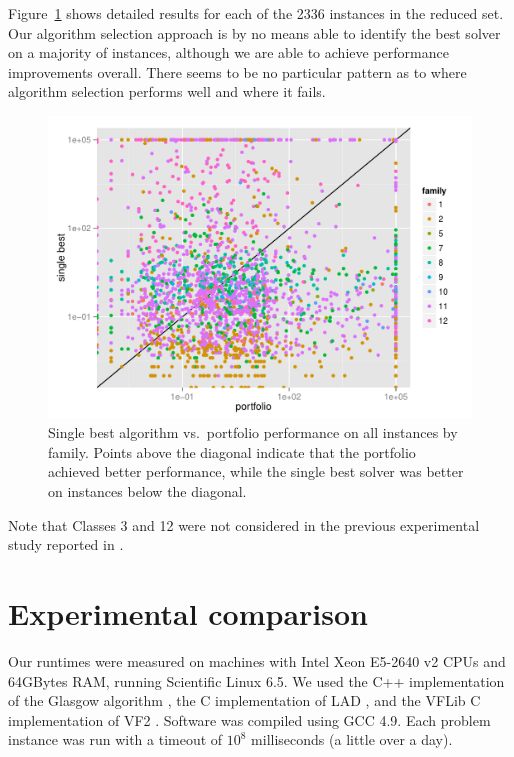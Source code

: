 \documentclass{llncs}
\begin{document}
Figure~\ref{fig:scatter} shows detailed results for each of the 2336 instances
in the reduced set. Our algorithm selection approach is by no means able to
identify the best solver on a majority of instances, although we are able to
achieve performance improvements overall. There seems to be no particular
pattern as to where algorithm selection performs well and where it fails.

\begin{figure}[!ht]
\includegraphics[width=\textwidth]{figures/perfScatter}
\caption{Single best algorithm vs.\ portfolio performance on all instances by
family. Points above the diagonal indicate that the portfolio achieved better
performance, while the single best solver was better on instances below the
diagonal.}
\label{fig:scatter}
\end{figure}

Note that Classes 3 and 12 were not considered in the previous experimental study reported in \cite{McCreesh:2015}.

\section{Experimental comparison}

Our runtimes were measured on machines with Intel Xeon E5-2640 v2 CPUs and 64GBytes RAM, running
Scientific Linux 6.5. We used the C++ implementation of the Glasgow algorithm \cite{McCreesh:2015},
the C implementation of LAD \cite{Solnon:2010}, and the VFLib C implementation of VF2
\cite{Cordella:2004}. Software was compiled using GCC 4.9. Each problem instance was run with a
timeout of $10^8$ milliseconds (a little over a day).
\end{document}
